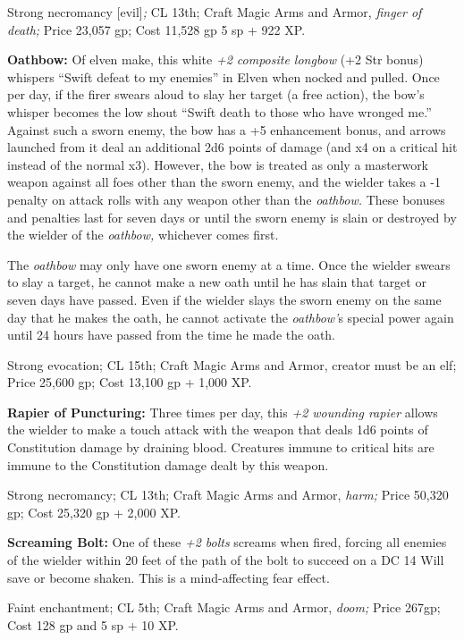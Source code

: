 Strong necromancy [evil]\textit{; }CL 13th; Craft Magic Arms and Armor, \textit{finger 
of death; }Price 23,057 gp; Cost 11,528 gp 5 sp + 922 XP.

\textbf{Oathbow:} Of elven make, this white \textit{+2 composite longbow }(+2 Str 
bonus) whispers ``Swift defeat to my enemies'' in Elven when nocked and pulled. 
Once per day, if the firer swears aloud to slay her target (a free action), the 
bow's whisper becomes the low shout ``Swift death to those who have wronged me.'' 
Against such a sworn enemy, the bow has a +5 enhancement bonus, and arrows launched 
from it deal an additional 2d6 points of damage (and x4 on a critical hit instead 
of the normal x3). However, the bow is treated as only a masterwork weapon against 
all foes other than the sworn enemy, and the wielder takes a -1 penalty on attack 
rolls with any weapon other than the \textit{oathbow. }These bonuses and penalties 
last for seven days or until the sworn enemy is slain or destroyed by the wielder 
of the \textit{oathbow, }whichever comes first.

The \textit{oathbow }may only have one sworn enemy at a time. Once the wielder 
swears to slay a target, he cannot make a new oath until he has slain that target 
or seven days have passed. Even if the wielder slays the sworn enemy on the same 
day that he makes the oath, he cannot activate the \textit{oathbow'}s special power 
again until 24 hours have passed from the time he made the oath.

Strong evocation; CL 15th; Craft Magic Arms and Armor, creator must be an elf; 
Price 25,600 gp; Cost 13,100 gp + 1,000 XP.

\textbf{Rapier of Puncturing: }Three times per day, this \textit{+2 wounding rapier 
}allows the wielder to make a touch attack with the weapon that deals 1d6 points 
of Constitution damage by draining blood. Creatures immune to critical hits are 
immune to the Constitution damage dealt by this weapon.

Strong necromancy; CL 13th; Craft Magic Arms and Armor, \textit{harm; }Price 50,320 
gp; Cost 25,320 gp + 2,000 XP.

\textbf{Screaming Bolt:} One of these \textit{+2 bolts }screams when fired, forcing 
all enemies of the wielder within 20 feet of the path of the bolt to succeed on 
a DC 14 Will save or become shaken. This is a mind-affecting fear effect.

Faint enchantment; CL 5th; Craft Magic Arms and Armor, \textit{doom; }Price 267gp; 
Cost 128 gp and 5 sp + 10 XP.

